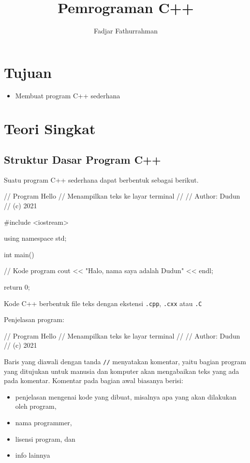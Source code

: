 \documentclass[a4paper,11pt,bahasa]{article} %
\newcommand{\txtinline}[1]{\texttt{#1}}
\begin{document}
\title{Pemrograman C++}
\author{Fadjar Fathurrahman}
\date{}
\maketitle

\section{Tujuan}

\begin{itemize}
\item Membuat program C++ sederhana
\end{itemize}



\section{Teori Singkat}


\subsection{Struktur Dasar Program C++}

Suatu program C++ sederhana dapat berbentuk sebagai berikut.
\begin{cppcode}
// Program Hello
// Menampilkan teks ke layar terminal
// 
// Author: Dudun
// (c) 2021

#include <iostream>

using namespace std;

int main()
{
  // Kode program
  cout << "Halo, nama saya adalah Dudun" << endl;

  return 0;
}
\end{cppcode}

Kode C++ berbentuk file teks dengan ekstensi \txtinline{.cpp},
\txtinline{.cxx} atau \txtinline{.C}

Penjelasan program:

\begin{cppcode}
// Program Hello
// Menampilkan teks ke layar terminal
// 
// Author: Dudun
// (c) 2021
\end{cppcode}
Baris yang diawali dengan tanda \txtinline{//} menyatakan komentar, yaitu bagian
program yang ditujukan untuk manusia dan komputer akan mengabaikan teks yang ada
pada komentar. Komentar pada bagian awal biasanya berisi:
\begin{itemize}
\item penjelasan mengenai kode yang dibuat, misalnya apa yang akan dilakukan oleh
    program,
\item nama programmer,
\item lisensi program, dan
\item info lainnya
\end{itemize}
\end{document}
